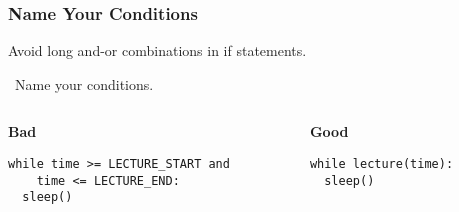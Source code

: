 \begin{frame}[fragile]

\frametitle{Name Your Conditions}

\begin{center}

Avoid long and-or combinations in if statements.

\end{center}

\vspace{\fill}

\begin{center}

\leftthumbsup~Name your conditions.~\rightthumbsup

\end{center}

\begin{columns}[t]

\begin{column}{0.5\textwidth}

\setlength{\topsep}{0pt}

\begin{center}

\textbf{Bad}

\begin{lstlisting}
while time >= LECTURE_START and
    time <= LECTURE_END:
  sleep()
\end{lstlisting}

\end{center}

\end{column}

\begin{column}{0.5\textwidth}

\setlength{\topsep}{0pt}

\begin{center}

\textbf{Good}

\end{center}

\begin{lstlisting}
while lecture(time):
  sleep()
\end{lstlisting}

\end{column}

\end{columns}

\vspace{\fill}

\end{frame}
